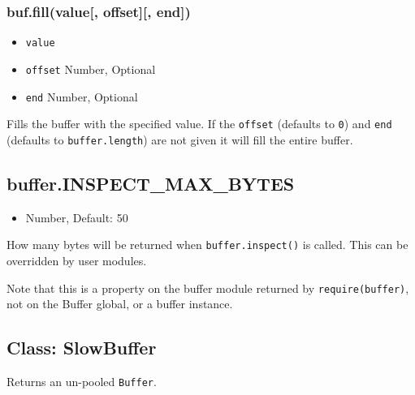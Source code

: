 \subsubsection{buf.fill(value{[}, offset{]}{[},
end{]})}\label{buf.fillvalue-offset-end}

\begin{itemize}
\itemsep1pt\parskip0pt
\item
  \texttt{value}
\item
  \texttt{offset} Number, Optional
\item
  \texttt{end} Number, Optional
\end{itemize}

Fills the buffer with the specified value. If the \texttt{offset}
(defaults to \texttt{0}) and \texttt{end} (defaults to
\texttt{buffer.length}) are not given it will fill the entire buffer.

\begin{Shaded}
\begin{Highlighting}[]
  \NormalTok{(}\NormalTok{);}
\NormalTok{(}\NormalTok{);}
\end{Highlighting}
\end{Shaded}

\subsection{buffer.INSPECT\_MAX\_BYTES}\label{buffer.inspectux5fmaxux5fbytes}

\begin{itemize}
\itemsep1pt\parskip0pt
\item
  Number, Default: 50
\end{itemize}

How many bytes will be returned when \texttt{buffer.inspect()} is
called. This can be overridden by user modules.

Note that this is a property on the buffer module returned by
\texttt{require(\textquotesingle{}buffer\textquotesingle{})}, not on the
Buffer global, or a buffer instance.

\subsection{Class: SlowBuffer}\label{class-slowbuffer}

Returns an un-pooled \texttt{Buffer}.

